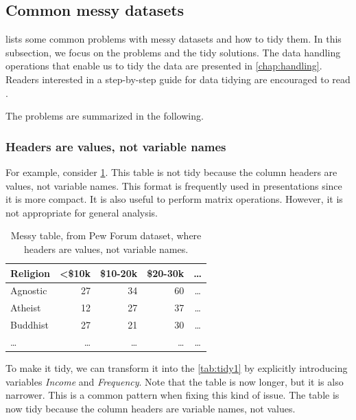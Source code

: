\subsection{Common messy datasets}
\label{sub:messy}

\textcite{Wickham2014} lists some common problems with messy
datasets and how to tidy them.  In this subsection, we focus on the problems and the
tidy solutions.  The data handling operations that enable us to tidy the data are
presented in \cref{chap:handling}.  Readers interested in a step-by-step guide for data
tidying are encouraged to read \textcite{Wickham2023}.

The problems are summarized in the following.

\subsubsection{Headers are values, not variable names}  For example, consider
\cref{tab:messy1}.  This table is not tidy because the column headers are values, not
variable names.  This format is frequently used in presentations since it is more compact.
It is also useful to perform matrix operations. However, it is not appropriate for general
analysis.

\begin{table}
  \centering
  \begin{tabular}{l r r r c}
    \toprule
    \textbf{Religion} & \textbf{<\$10k} & \textbf{\$10-20k} & \textbf{\$20-30k} & \textbf{\dots} \\
    \midrule
    Agnostic & 27 & 34 & 60 & \dots \\
    Atheist & 12 & 27 & 37 & \dots \\
    Buddhist & 27 & 21 & 30 & \dots \\
    \dots & \dots & \dots & \dots & \dots \\
    \bottomrule
  \end{tabular}
  \caption{Messy table, from Pew Forum dataset, where headers are values, not variable names.}
  \label{tab:messy1}
\end{table}

To make it tidy, we can transform it into the \cref{tab:tidy1} by explicitly introducing
variables \emph{Income} and \emph{Frequency}.
Note that the table is now longer, but it is also narrower.  This is a common pattern when
fixing this kind of issue.  The table is now tidy because the column headers are variable
names, not values.

